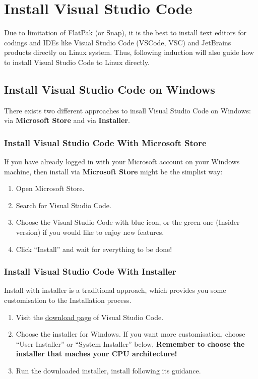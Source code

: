 \chapter{Install Visual Studio Code}
\label{Installation_VSCode}

Due to limitation of FlatPak (or Snap), it is the best to install text editors for codings and IDEs like Visual Studio Code (VSCode, VSC) and JetBrains products directly on Linux system. Thus, following induction will also guide how to install Visual Studio Code to Linux directly.

\section{Install Visual Studio Code on Windows}
\label{Installation_VSCode_Windows}

There exists two different approaches to insall Visual Studio Code on Windows: via \textbf{Microsoft Store} and via \textbf{Installer}.

\subsection{Install Visual Studio Code With Microsoft Store}
\label{Installation_VSCode_Windows_Store}

If you have already logged in with your Microsoft account on your Windows machine, then install via \textbf{Microsoft Store} might be the simplist way:
\begin{enumerate}
    \item Open Microsoft Store.
    \item Search for Visual Studio Code.
    \item Choose the Visual Studio Code with blue icon, or the green one (Insider version) if you would like to enjoy new features.
    \item Click ``Install'' and wait for everything to be done!
\end{enumerate}

\subsection{Install Visual Studio Code With Installer}
\label{Installation_VSCode_Windows_Installer}

Install with installer is a traditional approach, which provides you some customisation to the Installation process.
\begin{enumerate}
    \item Visit the \href{https://code.visualstudio.com/download}{download page} of Visual Studio Code.
    \item Choose the installer for Windows. If you want more customisation, choose ``User Installer'' or ``System Installer'' below, \textbf{Remember to choose the installer that maches your CPU architecture!}
    \item Run the downloaded installer, install following its guidance.
\end{enumerate}


